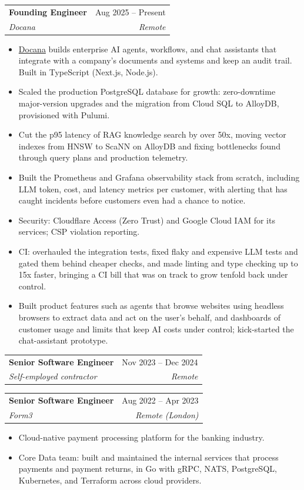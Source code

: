 \documentclass[letterpaper,12pt]{article}
\makeatletter
\newcommand{\resumeItem}[1]{
  \item
    {#1 \vspace{-2pt}}
}
\newcommand{\resumeSubheading}[4]{
  \vspace{-2pt}\item
    \begin{tabular*}{0.97\textwidth}[t]{l@{\extracolsep{\fill}}r}
      \textbf{#1} & #2 \\
      \textit{\small#3} & \textit{\small #4} \\
    \end{tabular*}\vspace{-7pt}
}
\newcommand{\resumeLead}[1]{
  \vspace{2pt}\item[] {#1 \vspace{-2pt}}
}
\newcommand{\resumeItemListStart}{\begin{itemize}}
\newcommand{\resumeItemListEnd}{\end{itemize}}
\makeatother
\begin{document}
    \resumeSubheading
      {Founding Engineer}{Aug 2025 -- Present}
      {Docana}{Remote}
      \resumeItemListStart
        \resumeLead{\href{https://docana.com/}{Docana} builds enterprise AI agents, workflows, and chat assistants that integrate with a company's documents and systems and keep an audit trail. Built in TypeScript (Next.js, Node.js).}
        \resumeItem{Scaled the production PostgreSQL database for growth: zero-downtime major-version upgrades and the migration from Cloud SQL to AlloyDB, provisioned with Pulumi.}
        \resumeItem{Cut the p95 latency of RAG knowledge search by over 50x, moving vector indexes from HNSW to ScaNN on AlloyDB and fixing bottlenecks found through query plans and production telemetry.}
        \resumeItem{Built the Prometheus and Grafana observability stack from scratch, including LLM token, cost, and latency metrics per customer, with alerting that has caught incidents before customers even had a chance to notice.}
        \resumeItem{Security: Cloudflare Access (Zero Trust) and Google Cloud IAM for its services; CSP violation reporting.}
        \resumeItem{CI: overhauled the integration tests, fixed flaky and expensive LLM tests and gated them behind cheaper checks, and made linting and type checking up to 15x faster, bringing a CI bill that was on track to grow tenfold back under control.}
        \resumeItem{Built product features such as agents that browse websites using headless browsers to extract data and act on the user's behalf, and dashboards of customer usage and limits that keep AI costs under control; kick-started the chat-assistant prototype.}
      \resumeItemListEnd

    \resumeSubheading
      {Senior Software Engineer}{Nov 2023 -- Dec 2024}
      {Self-employed contractor}{Remote}

    \resumeSubheading
      {Senior Software Engineer}{Aug 2022 -- Apr 2023}
      {Form3}{Remote (London)}
      \resumeItemListStart
        \resumeLead{Cloud-native payment processing platform for the banking industry.}
        \resumeItem{Core Data team: built and maintained the internal services that process payments and payment returns, in Go with gRPC, NATS, PostgreSQL, Kubernetes, and Terraform across cloud providers.}
      \resumeItemListEnd
\end{document}
